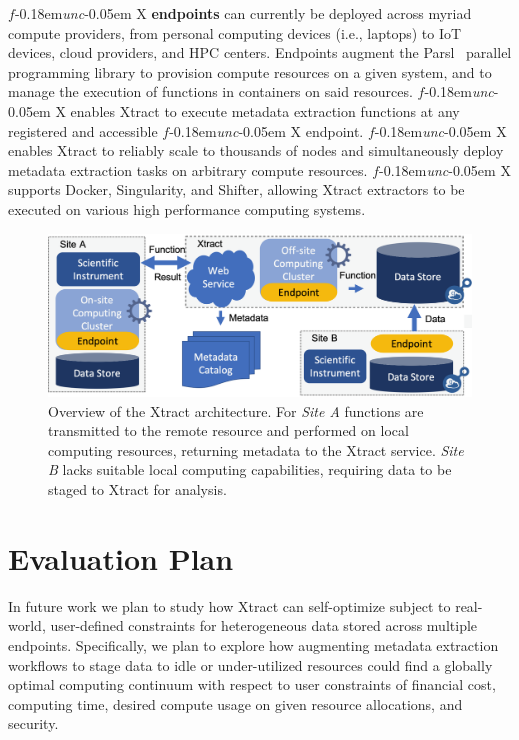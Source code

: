 \documentclass[sigconf, 9pt]{acmart}
\newcommand{\name}{Xtract}
\newcommand{\funcx}{$f$\kern-0.18em\emph{unc}\kern-0.05em X}
\begin{document}
\funcx{} \textbf{endpoints} can currently be deployed across myriad compute providers, from personal computing devices (i.e., laptops) to 
IoT devices, cloud providers, and HPC centers.  Endpoints augment the Parsl~\cite{babuji2019parsl} parallel programming library to 
provision compute resources on a given system, and to manage the execution of functions in containers on said resources. \funcx{} enables 
\name{} to execute metadata extraction functions at any registered and accessible \funcx{} endpoint.  \funcx{} enables \name{} to reliably 
scale to thousands of nodes and simultaneously deploy metadata extraction tasks on arbitrary compute resources. 
\funcx{} supports Docker, Singularity, and Shifter, allowing \name{} extractors to be executed
on various high performance computing systems. 


\begin{figure}[t]
	\centering
	\includegraphics[scale=0.17]{figs/updated-fig.png}
	\caption{Overview of the \name{} architecture. For \textit{Site A} functions are transmitted to the remote resource and performed on local computing resources, returning metadata to the \name{} service. \textit{Site B} lacks suitable local
	computing capabilities, requiring data to be staged to \name{} for analysis.}
	\label{fig:arch}
\end{figure}


\section{Evaluation Plan}
\label{sec:eval}

In future work we plan to study how \name{} can self-optimize subject to real-world, user-defined constraints for heterogeneous data stored across multiple 
endpoints.  Specifically, we plan to explore how augmenting metadata extraction workflows to stage data to idle or under-utilized resources could 
find a globally optimal computing continuum with respect to user constraints of financial cost, computing time, desired compute usage on 
given resource allocations, and security.
\end{document}
